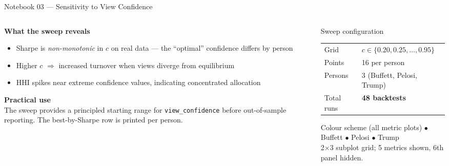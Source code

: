 \documentclass[aspectratio=169, 10pt]{beamer}
\begin{document}
\begin{frame}{Notebook 03 — Sensitivity to View Confidence}

  \begin{columns}[T]
    \begin{column}{0.5\textwidth}
      \textbf{What the sweep reveals}
      \begin{itemize}
        \item Sharpe is \emph{non-monotonic} in $c$ on real data —
              the ``optimal'' confidence differs by person
        \item Higher $c$ $\Rightarrow$ increased turnover when views
              diverge from equilibrium
        \item HHI spikes near extreme confidence values,
              indicating concentrated allocation
      \end{itemize}

      \bigskip
      \textbf{Practical use}\\
      The sweep provides a principled starting range for
      \texttt{view\_confidence} before out-of-sample reporting.
      The best-by-Sharpe row is printed per person.
    \end{column}

    \begin{column}{0.46\textwidth}
      \begin{block}{Sweep configuration}
        \small
        \begin{tabular}{@{}ll@{}}
          Grid       & $c \in \{0.20, 0.25, \ldots, 0.95\}$ \\
          Points     & 16 per person \\
          Persons    & 3 (Buffett, Pelosi, Trump) \\
          \midrule
          Total runs & \textbf{48 backtests} \\
        \end{tabular}
      \end{block}

      \bigskip
      \begin{block}{Colour scheme (all metric plots)}
        \small
        \textcolor{blnavy}{$\bullet$}\; Buffett \quad
        \textcolor{blamber}{$\bullet$}\; Pelosi \quad
        \textcolor{blteal}{$\bullet$}\; Trump \\[4pt]
        2$\times$3 subplot grid; 5 metrics shown,
        6th panel hidden.
      \end{block}
    \end{column}
  \end{columns}
\end{frame}
\end{document}
